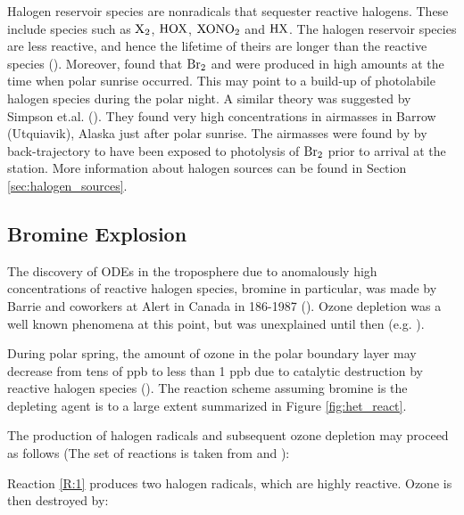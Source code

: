 \medskip

Halogen reservoir species are nonradicals that sequester reactive halogens. These include species such as $\mathrm{X_2}$, $\mathrm{HOX}$, $\mathrm{XONO_2}$ and $\mathrm{HX}$. The halogen reservoir species are less reactive, and hence the lifetime of theirs are longer than the reactive species (\cite{Simpson2015}). Moreover, \cite{Foster2001} found that $\mathrm{Br_2}$ and  were produced in high amounts at the time when polar sunrise occurred. This may point to a build-up of photolabile halogen species during the polar night. A similar theory was suggested by Simpson et.al. (\cite{Simpson2018}). They found very high  concentrations in airmasses in Barrow (Utquiavik), Alaska just after polar sunrise. The airmasses were found by by back-trajectory to have been exposed to photolysis of $\mathrm{Br_2}$ prior to arrival at the station. More information about halogen sources can be found in Section \ref{sec:halogen_sources}. 



\subsection{Bromine Explosion}\label{sec:BE}

The discovery of ODEs in the troposphere due to anomalously high concentrations of reactive halogen species, bromine in particular, was made by Barrie and coworkers at Alert in Canada in 186-1987 (\cite{BARRIE1986643}). Ozone depletion was a well known phenomena at this point, but was unexplained until then (e.g. \cite{Oltmans1981}). 

\medskip

During polar spring, the amount of ozone in the polar boundary layer may decrease from tens of ppb to less than 1 ppb due to catalytic destruction by reactive halogen species (\cite{CAO}). The reaction scheme assuming bromine is the depleting agent is to a large extent summarized in Figure \ref{fig:het_react}. 

\medskip



The production of halogen radicals and subsequent ozone depletion may proceed as follows (The set of reactions is taken from \cite{CAO} and \cite{Simpson2015}): 

\medskip

Reaction \ref{R:1} produces two halogen radicals, which are highly reactive. Ozone is then destroyed by: 

